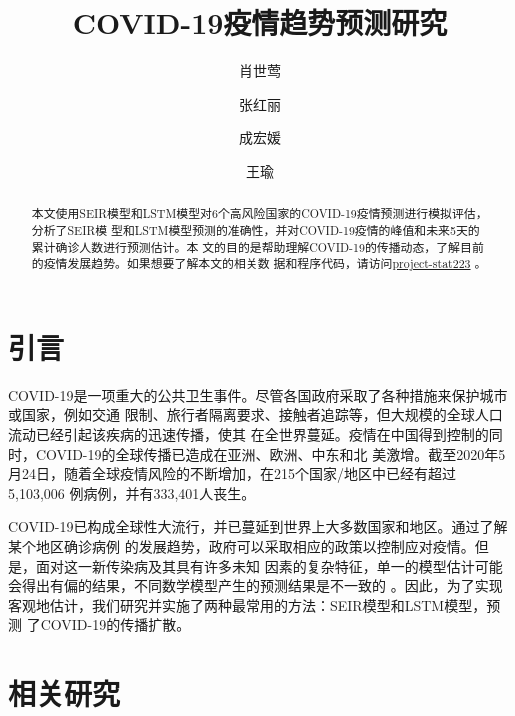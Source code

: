\documentclass[lang=cn,11.9pt,a4paper,cite=authoryear]{elegantpaper}
\title{COVID-19疫情趋势预测研究}
\author{肖世莺 \and 张红丽 \and 成宏媛 \and 王瑜}
\date{}
\begin{document}
\maketitle

\begin{abstract}
本文使用SEIR模型和LSTM模型对6个高风险国家的COVID-19疫情预测进行模拟评估，分析了SEIR模
型和LSTM模型预测的准确性，并对COVID-19疫情的峰值和未来5天的累计确诊人数进行预测估计。本
文的目的是帮助理解COVID-19的传播动态，了解目前的疫情发展趋势。如果想要了解本文的相关数
据和程序代码，请访问\href{https://github.com/data-science-in-action/project-stat223}{project-stat223}
。
\end{abstract}

\section{引言}

COVID-19是一项重大的公共卫生事件。尽管各国政府采取了各种措施来保护城市或国家，例如交通
限制、旅行者隔离要求、接触者追踪等，但大规模的全球人口流动已经引起该疾病的迅速传播，使其
在全世界蔓延。疫情在中国得到控制的同时，COVID-19的全球传播已造成在亚洲、欧洲、中东和北
美激增。截至2020年5月24日，随着全球疫情风险的不断增加，在215个国家/地区中已经有超过5,103,006
例病例，并有333,401人丧生。

COVID-19已构成全球性大流行，并已蔓延到世界上大多数国家和地区。通过了解某个地区确诊病例
的发展趋势，政府可以采取相应的政策以控制应对疫情。但是，面对这一新传染病及其具有许多未知
因素的复杂特征，单一的模型估计可能会得出有偏的结果，不同数学模型产生的预测结果是不一致的
。因此，为了实现客观地估计，我们研究并实施了两种最常用的方法：SEIR模型和LSTM模型，预测
了COVID-19的传播扩散。

\section{相关研究}
\end{document}
